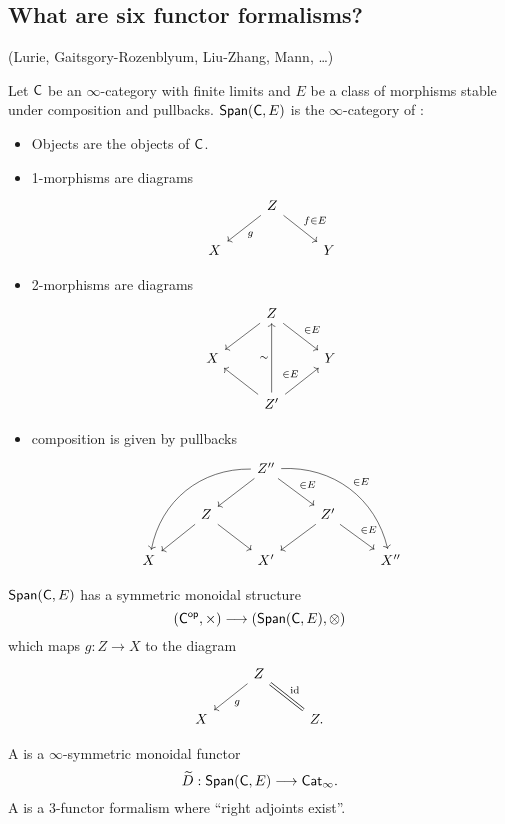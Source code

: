 \subsection{What are six functor formalisms?}
(Lurie, Gaitsgory-Rozenblyum, Liu-Zhang, Mann, \dots)

\begin{definition}[Fake]
	Let $\mathsf{C}$ be an $\infty$-category with finite limits and $E$ be a class of morphisms stable under composition and pullbacks. $\mathsf{Span}(\mathsf{C},E)$ is the $\infty$-category of :
	\begin{itemize}
		\item Objects are the objects of $\mathsf{C}$.
		\item 1-morphisms are diagrams
			\[
			\begin{tikzcd}
				& Z \ar[dl,"g"] \ar[dr,"f\in E"] \\
				X & & Y
			\end{tikzcd}
			\] 
		\item 2-morphisms are diagrams
			\[
			\begin{tikzcd}
				& Z \ar[dl] \ar[dr,"\in E"] \\
				X & & Y \\
				  & Z' \ar[lu] \ar[uu,"\sim"] \ar[ur,"\in E"]
			\end{tikzcd}
			\] 
		\item composition is given by pullbacks
			\[
			\begin{tikzcd}
				& & Z'' \ar[ddll, bend right=40] \ar[dl] \ar[dr,"\in E"] \ar[ddrr,bend left=40,"\in E"] \\
				& Z \ar[dl] \ar[dr] & & Z' \ar[dl] \ar[dr,"\in E"] \\
				X & & X' & & X''
			\end{tikzcd}
			\] 
	\end{itemize}
\end{definition}
$\mathsf{Span}(\mathsf{C},E)$ has a symmetric monoidal structure
\[
	(\C\op,\times )\to (\cat{Span}(\C,E),\otimes)
\] 
which maps $g:Z\to X$ to the diagram
\[
\begin{tikzcd}
	& Z \ar[dl,"g"] \ar[dr,equals,"\id"] \\
	X & & Z.
\end{tikzcd}
\] 
\begin{definition}[Mann]
	A  is a $\infty$-symmetric monoidal functor
	\[
		\wt{D}:\cat{Span}(\C,E) \to \cat{Cat}_\infty.
	\] 
	A  is a 3-functor formalism where ``right adjoints exist''.
\end{definition}

